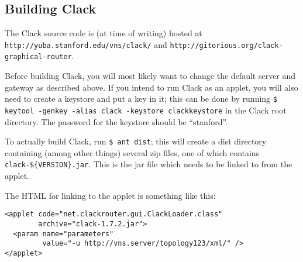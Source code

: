 \documentclass[a4paper,12pt]{article}
\begin{document}
\subsection{Building Clack}
The Clack source code is (at time of writing) hosted at
\texttt{http://yuba.stanford.edu/vns/clack/} and
\texttt{http://gitorious.org/clack-graphical-router}.

Before building Clack, you will most likely want to change the default server
and gateway as described above.  If you intend to run Clack as an applet, you
will also need to create a keystore and put a key in it; this can be done by
running \texttt{\$ keytool -genkey -alias clack -keystore clackkeystore} in the
Clack root directory.  The password for the keystore should be ``stanford''.

To actually build Clack, run \texttt{\$ ant dist}; this will create a dist
directory containing (among other things) several zip files, one of which
contains \texttt{clack-\$\{VERSION\}.jar}.  This is the jar file which needs to
be linked to from the applet.

The HTML for linking to the applet is something like this:

\begin{verbatim}
<applet code="net.clackrouter.gui.ClackLoader.class"
        archive="clack-1.7.2.jar">
  <param name="parameters"
         value="-u http://vns.server/topology123/xml/" />
</applet>
\end{verbatim}
\end{document}
